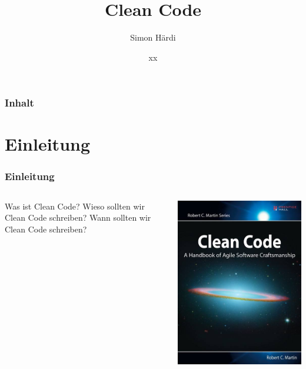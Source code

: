 \documentclass[handout]{beamer}
\title[CleanCode]{Clean Code}
\author{Simon Härdi}
\institute{Institute for Computational Engineering}
\date{xx}
\begin{document}
{
\begin{frame}
\maketitle
\end{frame}
}

\begin{frame}
    \frametitle{Inhalt}
    \tableofcontents
\end{frame}

\section{Einleitung}
\begin{frame}
\frametitle{Einleitung}
\begin{columns}
    \begin{column}{0.6\textwidth}
        \begin{outline}
            \1 Was ist Clean Code?
            \1 Wieso sollten wir Clean Code schreiben?
            \1 Wann sollten wir Clean Code schreiben?
        \end{outline}
    \end{column}
    \begin{column}{0.4\textwidth}
        \includegraphics[width=\linewidth]{cleanCodeBook.jpg}
    \end{column}
\end{columns}
\end{frame}
\end{document}
